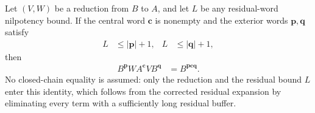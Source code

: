 \begin{lemma}
    \label{thm:mps_reduction_exterior_buffer}
    \leanok
    Let $(V,W)$ be a reduction from $B$ to $A$, and let $L$ be any
    residual-word nilpotency bound.  If the central word
    $\mathbf c$ is nonempty and the exterior words $\mathbf p,\mathbf q$
    satisfy
    \begin{align}
        L & \leq |\mathbf p|+1,
          & L                   & \leq |\mathbf q|+1,
        \label{eq:mps_reduction_exterior_buffer_bounds}
    \end{align}
    then
    \begin{align}
        B^{\mathbf p}WA^{\mathbf c}VB^{\mathbf q}
         & =B^{\mathbf p\mathbf c\mathbf q}.
        \label{eq:mps_reduction_exterior_buffer}
    \end{align}
    No closed-chain equality is assumed: only the reduction and the residual
    bound $L$ enter this identity, which follows from the corrected residual
    expansion by eliminating every term with a sufficiently long residual
    buffer.
\end{lemma}

